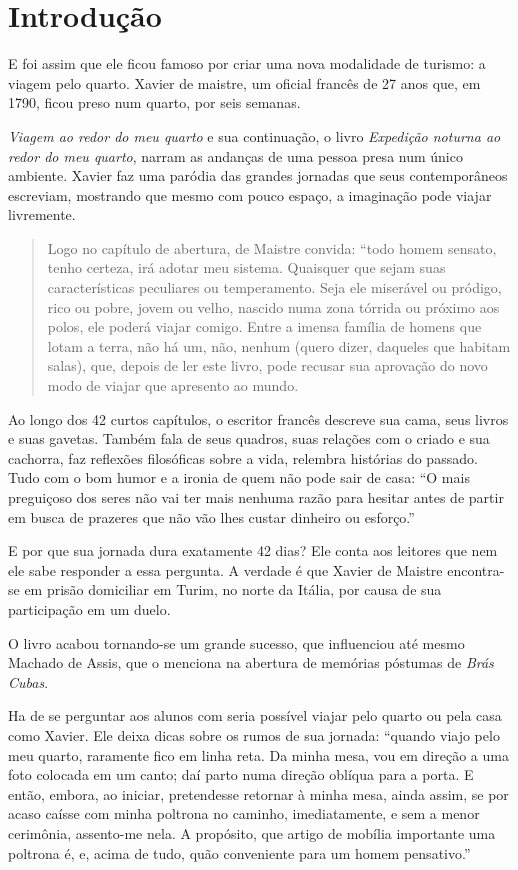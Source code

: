 \documentclass[12pt]{extarticle}
\begin{document}
\tableofcontents


\section{Introdução}

E foi assim que ele ficou famoso por criar uma nova modalidade de turismo: a viagem pelo quarto.
Xavier de maistre, um oficial francês de 27 anos que, em 1790, ficou preso num quarto, por seis semanas.

\textit{Viagem ao redor do meu quarto} e sua continuação, o livro 
\textit{Expedição noturna ao redor do meu quarto}, narram as andanças de uma pessoa presa num único ambiente. 
Xavier faz uma paródia das grandes jornadas que seus contemporâneos escreviam, 
mostrando que mesmo com pouco espaço, a imaginação pode viajar livremente.

\begin{quote}
Logo no capítulo de abertura, de Maistre convida: “todo homem sensato, tenho certeza, irá adotar meu sistema. 
Quaisquer que sejam suas características peculiares ou temperamento. Seja ele miserável ou pródigo, rico ou pobre, jovem ou velho, nascido numa zona tórrida ou próximo aos polos, ele poderá viajar comigo. Entre a imensa família de homens que lotam a terra, não há um, não, nenhum (quero dizer, daqueles que habitam salas), que, depois de ler este livro, pode recusar sua aprovação do novo modo de viajar que apresento ao mundo.
\end{quote}

Ao longo dos 42 curtos capítulos, o escritor francês descreve sua cama, 
seus livros e suas gavetas. Também fala de seus quadros, suas relações com o criado e 
sua cachorra, faz reflexões filosóficas sobre a vida, relembra histórias do passado. 
Tudo com o bom humor e a ironia de quem não pode sair de casa: “O mais preguiçoso dos 
seres não vai ter mais nenhuma razão para hesitar antes de partir em busca de prazeres que não vão lhes custar dinheiro ou esforço.”

E por que sua jornada dura exatamente 42 dias? Ele conta aos leitores que nem ele sabe responder a essa pergunta. A verdade é que Xavier de Maistre encontra-se em prisão domiciliar em Turim, no norte da Itália, por causa de sua participação em um duelo. 

O livro acabou tornando-se um grande sucesso, que influenciou até mesmo Machado de Assis, 
que o menciona na abertura de memórias póstumas de \textit{Brás Cubas}.

Ha de se perguntar aos alunos com seria possível viajar pelo quarto ou pela casa como Xavier. 
Ele deixa dicas sobre os rumos de sua jornada: “quando viajo pelo meu quarto, 
raramente fico em linha reta. Da minha mesa, vou em direção a uma foto colocada 
em um canto; daí parto numa direção oblíqua para a porta.
E então, embora, ao iniciar, pretendesse retornar à minha mesa, ainda assim, se por acaso caísse com minha poltrona no caminho, imediatamente, e sem a menor cerimônia, assento-me nela. A propósito, que artigo de mobília importante uma poltrona é, e, acima de tudo, quão conveniente para um homem pensativo.”
\end{document}
